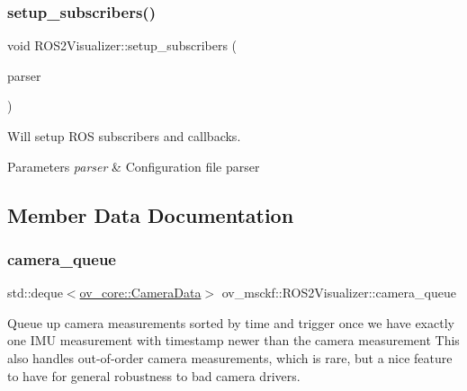 \subsubsection{\texorpdfstring{setup\+\_\+subscribers()}{setup\_subscribers()}}
{\footnotesize\ttfamily void R\+O\+S2\+Visualizer\+::setup\+\_\+subscribers (\begin{DoxyParamCaption}\item[{std\+::shared\+\_\+ptr$<$ \hyperlink{classov__core_1_1YamlParser}{ov\+\_\+core\+::\+Yaml\+Parser} $>$}]{parser }\end{DoxyParamCaption})}



Will setup R\+OS subscribers and callbacks. 


\begin{DoxyParams}{Parameters}
{\em parser} & Configuration file parser \\
\hline
\end{DoxyParams}


\subsection{Member Data Documentation}
\mbox{\label{classov__msckf_1_1ROS2Visualizer_a7235b339b34c7207b2cffb94d4518a25}} 
\subsubsection{\texorpdfstring{camera\+\_\+queue}{camera\_queue}}
{\footnotesize\ttfamily std\+::deque$<$\hyperlink{structov__core_1_1CameraData}{ov\+\_\+core\+::\+Camera\+Data}$>$ ov\+\_\+msckf\+::\+R\+O\+S2\+Visualizer\+::camera\+\_\+queue\hspace{0.3cm}{\ttfamily [protected]}}

Queue up camera measurements sorted by time and trigger once we have exactly one I\+MU measurement with timestamp newer than the camera measurement This also handles out-\/of-\/order camera measurements, which is rare, but a nice feature to have for general robustness to bad camera drivers. 